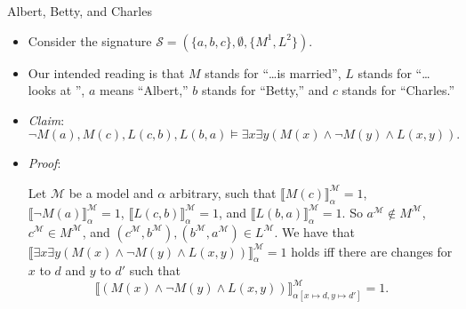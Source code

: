 \begin{frame}{Albert, Betty, and Charles}

\begin{itemize}
		
		\item Consider the signature $\mathcal{S}=(\{a,b,c\}, \emptyset, \{M^1, L^2\})$.

		\item Our intended reading is that $M$ stands for ``\dots is married'', $L$ stands for ``\dots looks at \underline{\phantom{\dots}}'', $a$ means ``Albert,'' $b$ stands for ``Betty,'' and $c$ stands for ``Charles.''
		
		\item \emph{Claim}: \[\neg M(a), M(c), L(c,b), L(b,a)\vDash \exists x\exists y(M(x)\land \neg M(y)\land L(x,y)).\]
		
		\item \emph{Proof}: 	
		
		Let $\mathcal{M}$ be a model and $\alpha$ arbitrary, such that $\llbracket M(c)\rrbracket_\alpha^\mathcal{M}=1$, $\llbracket\neg M(a)\rrbracket_\alpha^\mathcal{M}=1$, $\llbracket L(c,b)\rrbracket_\alpha^\mathcal{M}=1$, and $\llbracket L(b,a)\rrbracket_\alpha^\mathcal{M}=1$. So $a^\mathcal{M}\notin M^\mathcal{M}$, $c^\mathcal{M}\in M^\mathcal{M}$, and $( c^\mathcal{M}, b^\mathcal{M}), ( b^\mathcal{M}, a^\mathcal{M})\in L^\mathcal{M}$. We have that $\llbracket \exists x\exists y(M(x)\land \neg M(y)\land L(x,y))\rrbracket_\alpha^\mathcal{M}=1$ holds iff there are changes for $x$ to $d$ and $y$ to $d'$ such that \[\llbracket (M(x)\land \neg M(y)\land L(x,y))\rrbracket_{\alpha[x\mapsto d, y\mapsto d']}^\mathcal{M}=1.\] 
	\end{itemize}

\end{frame}


